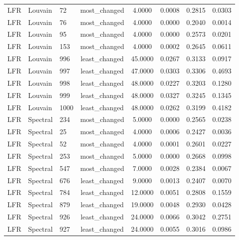 \begin{longtable}{lllccccc}
LFR & Louvain & 72 & most\_changed & 4.0000 & 0.0008 & 0.2815 & 0.0303 \\
LFR & Louvain & 76 & most\_changed & 4.0000 & 0.0000 & 0.2040 & 0.0014 \\
LFR & Louvain & 95 & most\_changed & 4.0000 & 0.0000 & 0.2573 & 0.0201 \\
LFR & Louvain & 153 & most\_changed & 4.0000 & 0.0002 & 0.2645 & 0.0611 \\
LFR & Louvain & 996 & least\_changed & 45.0000 & 0.0267 & 0.3133 & 0.0917 \\
LFR & Louvain & 997 & least\_changed & 47.0000 & 0.0303 & 0.3306 & 0.4693 \\
LFR & Louvain & 998 & least\_changed & 48.0000 & 0.0227 & 0.3203 & 0.1280 \\
LFR & Louvain & 999 & least\_changed & 48.0000 & 0.0327 & 0.3245 & 0.1345 \\
LFR & Louvain & 1000 & least\_changed & 48.0000 & 0.0262 & 0.3199 & 0.4182 \\
LFR & Spectral & 234 & most\_changed & 5.0000 & 0.0000 & 0.2565 & 0.0238 \\
LFR & Spectral & 25 & most\_changed & 4.0000 & 0.0006 & 0.2427 & 0.0036 \\
LFR & Spectral & 52 & most\_changed & 4.0000 & 0.0001 & 0.2601 & 0.0227 \\
LFR & Spectral & 253 & most\_changed & 5.0000 & 0.0000 & 0.2668 & 0.0998 \\
LFR & Spectral & 547 & most\_changed & 7.0000 & 0.0028 & 0.2384 & 0.0067 \\
LFR & Spectral & 676 & least\_changed & 9.0000 & 0.0013 & 0.2407 & 0.0070 \\
LFR & Spectral & 784 & least\_changed & 12.0000 & 0.0051 & 0.2808 & 0.1559 \\
LFR & Spectral & 879 & least\_changed & 19.0000 & 0.0048 & 0.2930 & 0.0428 \\
LFR & Spectral & 926 & least\_changed & 24.0000 & 0.0066 & 0.3042 & 0.2751 \\
LFR & Spectral & 927 & least\_changed & 24.0000 & 0.0055 & 0.3016 & 0.0986 \\
\end{longtable}